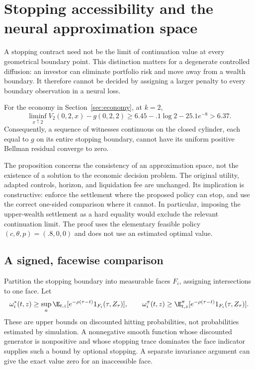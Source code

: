 \section{Stopping accessibility and the neural approximation space}\label{sec:accessibility}
A stopping contract need not be the limit of continuation value at every geometrical boundary point. This distinction matters for a degenerate controlled diffusion: an investor can eliminate portfolio risk and move away from a wealth boundary. It therefore cannot be decided by assigning a larger penalty to every boundary observation in a neural loss.

\begin{proposition}\label{prop:traceconsistency}
For the economy in Section~\ref{sec:economy}, at $k=2$,
\begin{equation}
 \liminf_{x\uparrow2}V_2(0,2,x)-g(0,2,2)
 \geq 6.45-.1\log2-25.1e^{-8}>6.37.\label{eq:tracejump}
\end{equation}
Consequently, a sequence of witnesses continuous on the closed cylinder, each equal to $g$ on its entire stopping boundary, cannot have its uniform positive Bellman residual converge to zero.
\end{proposition}
The proposition concerns the consistency of an approximation space, not the existence of a solution to the economic decision problem. The original utility, adapted controls, horizon, and liquidation fee are unchanged. Its implication is constructive: enforce the settlement where the proposed policy can stop, and use the correct one-sided comparison where it cannot. In particular, imposing the upper-wealth settlement as a hard equality would exclude the relevant continuation limit. The proof uses the elementary feasible policy $(c,\theta,p)=(.8,0,0)$ and does not use an estimated optimal value.

\subsection{A signed, facewise comparison}
Partition the stopping boundary into measurable faces $F_i$, assigning intersections to one face. Let
\[
 \omega_i^*(t,z)\geq\sup_a\E_{t,z}[e^{-\rho(\tau-t)}1_{F_i}(\tau,Z_\tau)],
 \qquad
 \omega_i^\pi(t,z)\geq\E_{t,z}^{\pi}[e^{-\rho(\tau-t)}1_{F_i}(\tau,Z_\tau)].
\]
These are upper bounds on discounted hitting probabilities, not probabilities estimated by simulation. A nonnegative smooth function whose discounted generator is nonpositive and whose stopping trace dominates the face indicator supplies such a bound by optional stopping. A separate invariance argument can give the exact value zero for an inaccessible face.

